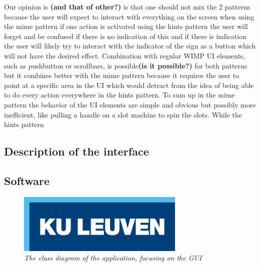 Our opinion is \textbf{(and that of other?)} is that one should not mix the 2 patterns because the user will expect to interact with everything on the screen when using the mime pattern if one action is activated using the hints pattern the user will forget and be confused if there is no indication of this and if there is indication the user will likely try to interact with the indicator of the sign as a button which will not have the desired effect. Combination with regular WIMP UI elements, such as pushbutton or scrollbars, is possible\textbf{(is it possible?)} for both patterns but it combines better with the mime pattern because it requires the user to point at a specific area in the UI which would detract from the idea of being able to do every action everywhere in the hints pattern. To sum up in the mime pattern the behavior of the UI elements are simple and obvious but possibly more inefficient, like pulling a handle on a slot machine to spin the slots. While the hints pattern 

 


\subsection{Description of the interface}


\subsection{Software}

\begin{figure}[H]
\begin{center}
\includegraphics[width=8cm]{KUL.png} %
\caption{\emph{The class diagram of the application, focusing on the GUI}}
\label{fig: gui_classdiagram}
\end{center}
\end{figure}



